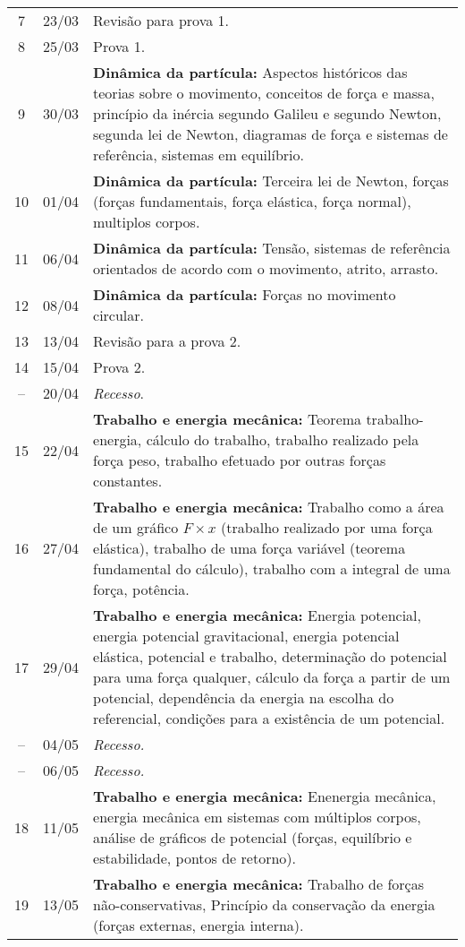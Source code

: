 \begin{center}
\begin{longtable}{ccp{70mm}}
  7 & 23/03 & Revisão para prova 1. \\
  8 & 25/03 & Prova 1. \\
  9 & 30/03 & \textbf{Dinâmica da partícula:} Aspectos históricos das teorias sobre o movimento, conceitos de força e massa, princípio da inércia segundo Galileu e segundo Newton, segunda lei de Newton, diagramas de força e sistemas de referência, sistemas em equilíbrio.\\
 10 & 01/04 & \textbf{Dinâmica da partícula:} Terceira lei de Newton, forças (forças fundamentais, força elástica, força normal), multiplos corpos.\\
 11 & 06/04 & \textbf{Dinâmica da partícula:} Tensão, sistemas de referência orientados de acordo com o movimento, atrito, arrasto.\\
 12 & 08/04 & \textbf{Dinâmica da partícula:} Forças no movimento circular. \\
 13 & 13/04 & Revisão para a prova 2. \\
 14 & 15/04 & Prova 2. \\
 -- & 20/04 & \emph{Recesso}. \\
 15 & 22/04 & \textbf{Trabalho e energia mecânica:} Teorema trabalho-energia, cálculo do trabalho, trabalho realizado pela força peso, trabalho efetuado por outras forças constantes.\\
 16 & 27/04 & \textbf{Trabalho e energia mecânica:} Trabalho como a área de um gráfico $F \times x$ (trabalho realizado por uma força elástica), trabalho de uma força variável (teorema fundamental do cálculo), trabalho com a integral de uma força, potência. \\
 17 & 29/04 & \textbf{Trabalho e energia mecânica:} Energia potencial, energia potencial gravitacional, energia potencial elástica, potencial e trabalho, determinação do potencial para uma força qualquer, cálculo da força a partir de um potencial, dependência da energia na escolha do referencial, condições para a existência de um potencial. \\
 -- & 04/05 & \emph{Recesso.} \\
 -- & 06/05 & \emph{Recesso.} \\
 18 & 11/05 & \textbf{Trabalho e energia mecânica:} Enenergia mecânica, energia mecânica em sistemas com múltiplos corpos, análise de gráficos de potencial (forças, equilíbrio e estabilidade, pontos de retorno). \\
 19 & 13/05 & \textbf{Trabalho e energia mecânica:} Trabalho de forças não-conservativas, Princípio da conservação da energia (forças externas, energia interna). \\

\end{longtable}
\end{center}
